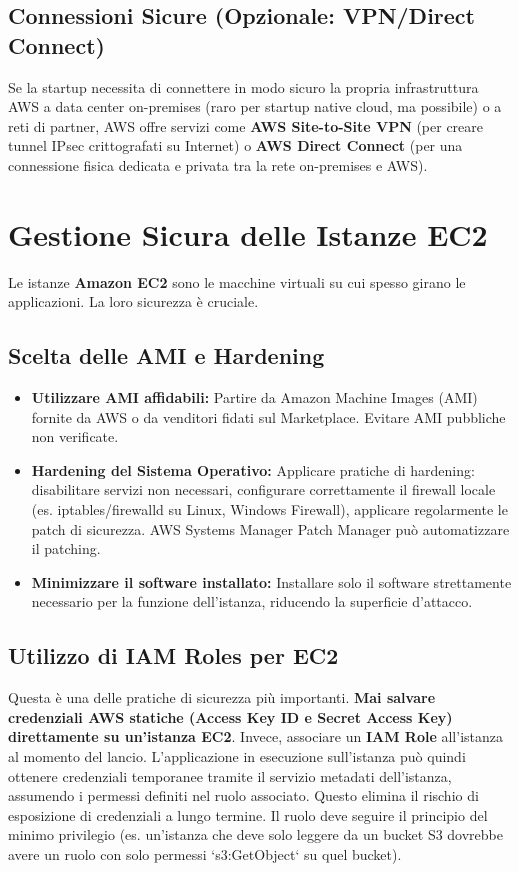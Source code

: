 \subsection{Connessioni Sicure (Opzionale: VPN/Direct Connect)}
\label{subsec:vpn-directconnect}
Se la startup necessita di connettere in modo sicuro la propria infrastruttura AWS a data center on-premises (raro per startup native cloud, ma possibile) o a reti di partner, AWS offre servizi come \textbf{AWS Site-to-Site VPN} (per creare tunnel IPsec crittografati su Internet) o \textbf{AWS Direct Connect} (per una connessione fisica dedicata e privata tra la rete on-premises e AWS).

\section{Gestione Sicura delle Istanze EC2}
\label{sec:ec2-security}
Le istanze \textbf{Amazon EC2} sono le macchine virtuali su cui spesso girano le applicazioni. La loro sicurezza è cruciale.

\subsection{Scelta delle AMI e Hardening}
\label{subsec:ami-hardening}
\begin{itemize}
    \item \textbf{Utilizzare AMI affidabili:} Partire da Amazon Machine Images (AMI) fornite da AWS o da venditori fidati sul Marketplace. Evitare AMI pubbliche non verificate.
    \item \textbf{Hardening del Sistema Operativo:} Applicare pratiche di hardening: disabilitare servizi non necessari, configurare correttamente il firewall locale (es. iptables/firewalld su Linux, Windows Firewall), applicare regolarmente le patch di sicurezza. AWS Systems Manager Patch Manager può automatizzare il patching.
    \item \textbf{Minimizzare il software installato:} Installare solo il software strettamente necessario per la funzione dell'istanza, riducendo la superficie d'attacco.
\end{itemize}

\subsection{Utilizzo di IAM Roles per EC2}
\label{subsec:iam-roles-ec2}
Questa è una delle pratiche di sicurezza più importanti. \textbf{Mai salvare credenziali AWS statiche (Access Key ID e Secret Access Key) direttamente su un'istanza EC2}. Invece, associare un \textbf{IAM Role} all'istanza al momento del lancio. L'applicazione in esecuzione sull'istanza può quindi ottenere credenziali temporanee tramite il servizio metadati dell'istanza, assumendo i permessi definiti nel ruolo associato. Questo elimina il rischio di esposizione di credenziali a lungo termine. Il ruolo deve seguire il principio del minimo privilegio (es. un'istanza che deve solo leggere da un bucket S3 dovrebbe avere un ruolo con solo permessi `s3:GetObject` su quel bucket).

